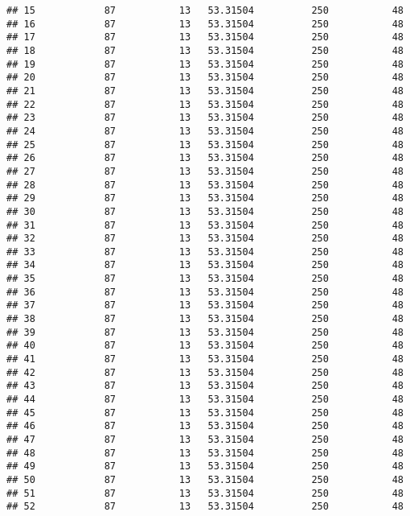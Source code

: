 \documentclass[]{article}
\begin{document}
\begin{verbatim}
## 15            87           13   53.31504          250           48
## 16            87           13   53.31504          250           48
## 17            87           13   53.31504          250           48
## 18            87           13   53.31504          250           48
## 19            87           13   53.31504          250           48
## 20            87           13   53.31504          250           48
## 21            87           13   53.31504          250           48
## 22            87           13   53.31504          250           48
## 23            87           13   53.31504          250           48
## 24            87           13   53.31504          250           48
## 25            87           13   53.31504          250           48
## 26            87           13   53.31504          250           48
## 27            87           13   53.31504          250           48
## 28            87           13   53.31504          250           48
## 29            87           13   53.31504          250           48
## 30            87           13   53.31504          250           48
## 31            87           13   53.31504          250           48
## 32            87           13   53.31504          250           48
## 33            87           13   53.31504          250           48
## 34            87           13   53.31504          250           48
## 35            87           13   53.31504          250           48
## 36            87           13   53.31504          250           48
## 37            87           13   53.31504          250           48
## 38            87           13   53.31504          250           48
## 39            87           13   53.31504          250           48
## 40            87           13   53.31504          250           48
## 41            87           13   53.31504          250           48
## 42            87           13   53.31504          250           48
## 43            87           13   53.31504          250           48
## 44            87           13   53.31504          250           48
## 45            87           13   53.31504          250           48
## 46            87           13   53.31504          250           48
## 47            87           13   53.31504          250           48
## 48            87           13   53.31504          250           48
## 49            87           13   53.31504          250           48
## 50            87           13   53.31504          250           48
## 51            87           13   53.31504          250           48
## 52            87           13   53.31504          250           48

\end{verbatim}
\end{document}
